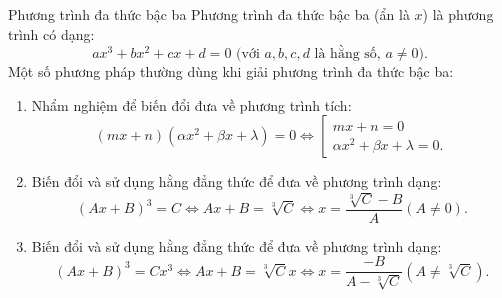\begin{dang}{Phương trình đa thức bậc ba}
Phương trình đa thức bậc ba (ẩn là $x$) là phương trình có dạng:
$$ax^3+bx^2+cx+d=0\,\,\text{(với $a, b, c, d$ là hằng số, $a\ne 0$)}.$$
Một số phương pháp thường dùng khi giải phương trình đa thức bậc ba:
\begin{enumerate}
	\item Nhẩm nghiệm để biến đổi đưa về phương trình tích:
	$$(mx + n)\left( {\alpha x^2 + \beta x + \lambda } \right) = 0 \Leftrightarrow \left[ \begin{array}{l}
	mx + n = 0\\
	\alpha x^2 + \beta x + \lambda  = 0.
	\end{array} \right.$$
	\item Biến đổi và sử dụng hằng đẳng thức để  đưa về phương trình dạng:
	\[{\left( {Ax + B} \right)^3} = C \Leftrightarrow Ax + B = \sqrt[3]{C} \Leftrightarrow x = \frac{{\sqrt[3]{C} - B}}{A}\left( {A \ne 0} \right).\]
	\item Biến đổi và sử dụng hằng đẳng thức để  đưa về phương trình dạng:
	\[{\left( {Ax + B} \right)^3} = Cx^3 \Leftrightarrow Ax + B = \sqrt[3]{C}x \Leftrightarrow x = \frac{{ - B}}{{A - \sqrt[3]{C}}}\left( {A \ne \sqrt[3]{C}} \right).\]
\end{enumerate}
\end{dang}


